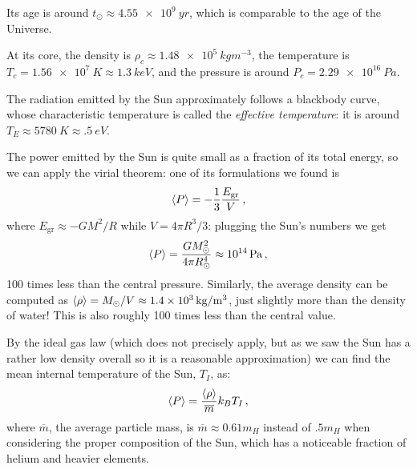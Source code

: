 \documentclass[main.tex]{subfiles}
\begin{document}
Its age is around \(t_{\odot} \approx \SI{4.55e9}{yr}\), which is comparable to the age of the Universe. 

At its core, the density is \(\rho _c \approx \SI{1.48e5}{kg m^{-3}}\), the temperature is \(T_c = \SI{1.56e7}{K} \approx \SI{1.3}{keV}\), and the pressure is around \(P_c = \SI{2.29e16}{Pa}\).  

The radiation emitted by the Sun approximately follows a blackbody curve, whose characteristic temperature is called the \emph{effective temperature}: it is around \(T_E \approx \SI{5780}{K} \approx \SI{.5}{eV}\). 


The power emitted by the Sun is quite small as a fraction of its total energy, so we can apply the virial theorem: one of its formulations we found is
%
\begin{align}
  \expval{P} = -\frac{1}{3} \frac{E _{\text{gr}}}{V}
\,,
\end{align}
%
where \(E _{\text{gr}} \approx - G M^2/R\) while \(V = 4 \pi R^3/3\): plugging the Sun's numbers we get 
%
\begin{align}
  \expval{P} 
  = \frac{G M_{\odot}^2}{4 \pi R_{\odot}^{4}}
  \approx \SI{e14}{Pa}
\,,
\end{align}
%
100 times less than the central pressure. 
Similarly, the average density can be computed as \(\expval{\rho } = M _{\odot} / V \approx \SI{1.4e3}{kg/m^3}\), just slightly more than the density of water! This is also roughly 100 times less than the central value.



By the ideal gas law (which does not precisely apply, but as we saw the Sun has a rather low density overall so it is a reasonable approximation) we can find the mean internal temperature of the Sun, \(T_I\), as:
%
\begin{align}
  \expval{P} = \frac{\expval{\rho}}{\overline{m}} k_B T_I
\,,
\end{align}
%
where \(\overline{m}\), the average particle mass, is \(\overline{m} \approx 0.61 m_H\) instead of \(\num{.5} m_H\) when considering the proper composition of the Sun, which has a noticeable fraction of helium and heavier elements. 
\end{document}
